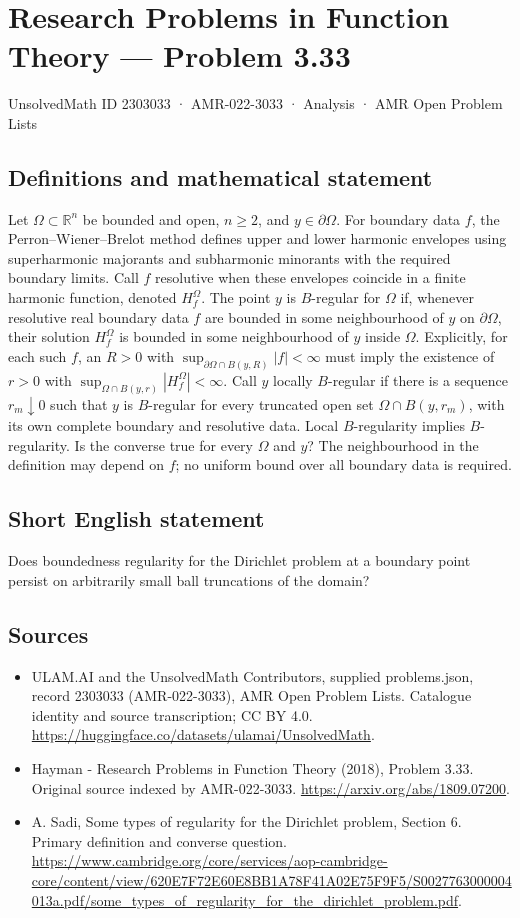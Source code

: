 \documentclass[11pt,a4paper]{article}
\begin{document}
\section*{Research Problems in Function Theory — Problem 3.33}\label{2303033}
{\small UnsolvedMath ID 2303033 · AMR-022-3033 · Analysis · AMR Open Problem Lists}
\subsection{Definitions and mathematical statement}
Let $\Omega\subset\mathbb R^n$ be bounded and open, $n\ge2$, and $y\in\partial\Omega$. For boundary data $f$, the Perron--Wiener--Brelot method defines upper and lower harmonic envelopes using superharmonic majorants and subharmonic minorants with the required boundary limits. Call $f$ resolutive when these envelopes coincide in a finite harmonic function, denoted $H_f^\Omega$.
The point $y$ is $B$-regular for $\Omega$ if, whenever resolutive real boundary data $f$ are bounded in some neighbourhood of $y$ on $\partial\Omega$, their solution $H_f^\Omega$ is bounded in some neighbourhood of $y$ inside $\Omega$. Explicitly, for each such $f$, an $R>0$ with
$\sup_{\partial\Omega\cap B(y,R)}|f|<\infty$ must imply the existence of $r>0$ with
$\sup_{\Omega\cap B(y,r)}|H_f^\Omega|<\infty$.
Call $y$ locally $B$-regular if there is a sequence $r_m\downarrow0$ such that $y$ is $B$-regular for every truncated open set $\Omega\cap B(y,r_m)$, with its own complete boundary and resolutive data.
Local $B$-regularity implies $B$-regularity. Is the converse true for every $\Omega$ and $y$? The neighbourhood in the definition may depend on $f$; no uniform bound over all boundary data is required.
\subsection{Short English statement}
Does boundedness regularity for the Dirichlet problem at a boundary point persist on arbitrarily small ball truncations of the domain?
\subsection{Sources}
\begin{itemize}
\item[S1] ULAM.AI and the UnsolvedMath Contributors, supplied problems.json, record 2303033 (AMR-022-3033), AMR Open Problem Lists. Catalogue identity and source transcription; CC BY 4.0.
\url{https://huggingface.co/datasets/ulamai/UnsolvedMath}.
\item[S2] Hayman - Research Problems in Function Theory (2018), Problem 3.33. Original source indexed by AMR-022-3033.
\url{https://arxiv.org/abs/1809.07200}.
\item[S3] A. Sadi, Some types of regularity for the Dirichlet problem, Section 6. Primary definition and converse question.
\url{https://www.cambridge.org/core/services/aop-cambridge-core/content/view/620E7F72E60E8BB1A78F41A02E75F9F5/S0027763000004013a.pdf/some_types_of_regularity_for_the_dirichlet_problem.pdf}.
\end{itemize}
\end{document}
